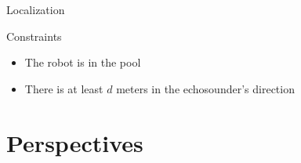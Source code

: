 \documentclass[10pt, xcolor={usenames, dvipsnames}]{beamer}
\begin{document}
            \begin{frame}{Localization}
                \begin{minipage}[c]{.55\textwidth}
                    \begin{alertblock}{Constraints}
                        \vspace{0.25cm}
                        \begin{itemize}
                            \item<2-> The robot is in the pool
                            \item<3-> There is at least $d$ meters in the echosounder's direction
                        \end{itemize}
                    \end{alertblock}
                \end{minipage}%
                \hfill
                \begin{minipage}[c]{.45\textwidth}
                    \centering
                    \begin{figure}
                        \begin{overprint}
                            \centerline{}
                            \centerline{}
                            \centerline{}
                        \end{overprint}
                        \caption{}
                   \end{figure}
                \end{minipage}
            \end{frame}

    \section{Perspectives}
\end{document}
